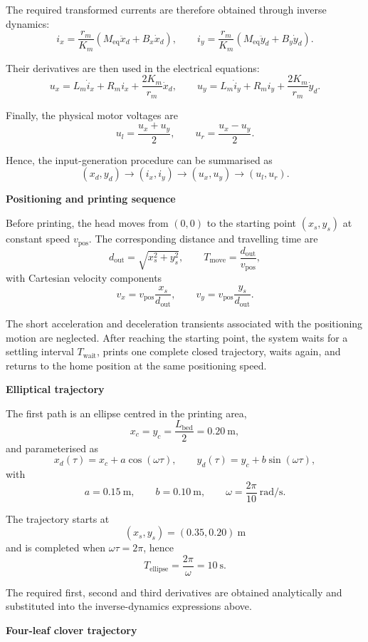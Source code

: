 \documentclass[11pt,a4paper]{article}
\begin{document}
The required transformed currents are therefore obtained through inverse
dynamics:
\[
i_x=
\frac{r_m}{K_m}
\left(M_{\mathrm{eq}}\ddot{x}_d+B_x\dot{x}_d\right),
\qquad
i_y=
\frac{r_m}{K_m}
\left(M_{\mathrm{eq}}\ddot{y}_d+B_y\dot{y}_d\right).
\]

Their derivatives are then used in the electrical equations:
\[
u_x=L_m\dot{i}_x+R_mi_x+\frac{2K_m}{r_m}\dot{x}_d,
\qquad
u_y=L_m\dot{i}_y+R_mi_y+\frac{2K_m}{r_m}\dot{y}_d.
\]

Finally, the physical motor voltages are
\[
u_l=\frac{u_x+u_y}{2},
\qquad
u_r=\frac{u_x-u_y}{2}.
\]

Hence, the input-generation procedure can be summarised as
\[
(x_d,y_d)
\rightarrow
(i_x,i_y)
\rightarrow
(u_x,u_y)
\rightarrow
(u_l,u_r).
\]

\medskip
\noindent\textbf{Positioning and printing sequence}

Before printing, the head moves from $(0,0)$ to the starting point
$(x_s,y_s)$ at constant speed $v_{\mathrm{pos}}$. The corresponding
distance and travelling time are
\[
d_{\mathrm{out}}=\sqrt{x_s^2+y_s^2},
\qquad
T_{\mathrm{move}}=\frac{d_{\mathrm{out}}}{v_{\mathrm{pos}}},
\]
with Cartesian velocity components
\[
v_x=v_{\mathrm{pos}}\frac{x_s}{d_{\mathrm{out}}},
\qquad
v_y=v_{\mathrm{pos}}\frac{y_s}{d_{\mathrm{out}}}.
\]

The short acceleration and deceleration transients associated with the
positioning motion are neglected. After reaching the starting point,
the system waits for a settling interval \(T_{\mathrm{wait}}\), prints one complete closed
trajectory, waits again, and returns to the home position at the same
positioning speed.


\medskip
\noindent\textbf{Elliptical trajectory}

The first path is an ellipse centred in the printing area,
\[
x_c=y_c=\frac{L_{\mathrm{bed}}}{2}=0.20~\mathrm{m},
\]
and parameterised as
\[
x_d(\tau)=x_c+a\cos(\omega\tau),
\qquad
y_d(\tau)=y_c+b\sin(\omega\tau),
\]
with
\[
a=0.15~\mathrm{m},
\qquad
b=0.10~\mathrm{m},
\qquad
\omega=\frac{2\pi}{10}~\mathrm{rad/s}.
\]

The trajectory starts at
\[
(x_s,y_s)=(0.35,0.20)~\mathrm{m}
\]
and is completed when $\omega\tau=2\pi$, hence
\[
T_{\mathrm{ellipse}}=\frac{2\pi}{\omega}=10~\mathrm{s}.
\]

The required first, second and third derivatives are obtained analytically
and substituted into the inverse-dynamics expressions above.

\medskip
\noindent\textbf{Four-leaf clover trajectory}
\end{document}
